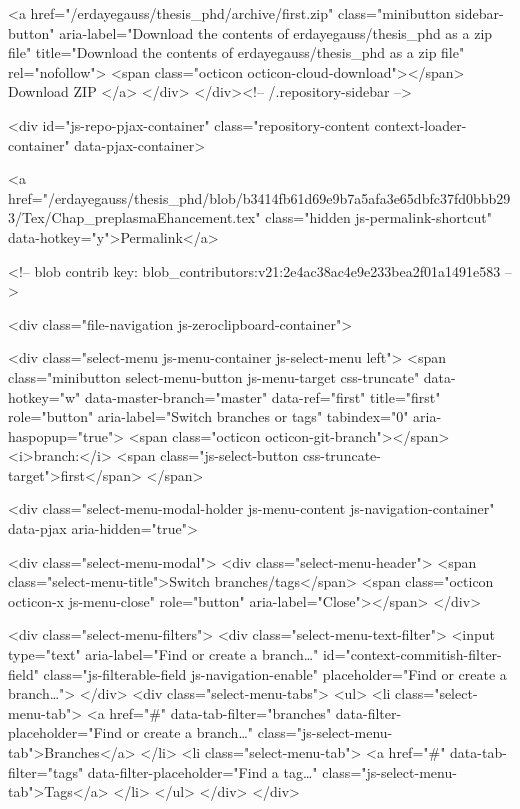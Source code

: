                 <a href="/erdayegauss/thesis_phd/archive/first.zip"
                   class="minibutton sidebar-button"
                   aria-label="Download the contents of erdayegauss/thesis_phd as a zip file"
                   title="Download the contents of erdayegauss/thesis_phd as a zip file"
                   rel="nofollow">
                  <span class="octicon octicon-cloud-download"></span>
                  Download ZIP
                </a>
              </div>
        </div><!-- /.repository-sidebar -->

        <div id="js-repo-pjax-container" class="repository-content context-loader-container" data-pjax-container>
          

<a href="/erdayegauss/thesis_phd/blob/b3414fb61d69e9b7a5afa3e65dbfc37fd0bbb293/Tex/Chap_preplasmaEhancement.tex" class="hidden js-permalink-shortcut" data-hotkey="y">Permalink</a>

<!-- blob contrib key: blob_contributors:v21:2e4ac38ac4e9e233bea2f01a1491e583 -->

<div class="file-navigation js-zeroclipboard-container">
  
<div class="select-menu js-menu-container js-select-menu left">
  <span class="minibutton select-menu-button js-menu-target css-truncate" data-hotkey="w"
    data-master-branch="master"
    data-ref="first"
    title="first"
    role="button" aria-label="Switch branches or tags" tabindex="0" aria-haspopup="true">
    <span class="octicon octicon-git-branch"></span>
    <i>branch:</i>
    <span class="js-select-button css-truncate-target">first</span>
  </span>

  <div class="select-menu-modal-holder js-menu-content js-navigation-container" data-pjax aria-hidden="true">

    <div class="select-menu-modal">
      <div class="select-menu-header">
        <span class="select-menu-title">Switch branches/tags</span>
        <span class="octicon octicon-x js-menu-close" role="button" aria-label="Close"></span>
      </div>

      <div class="select-menu-filters">
        <div class="select-menu-text-filter">
          <input type="text" aria-label="Find or create a branch…" id="context-commitish-filter-field" class="js-filterable-field js-navigation-enable" placeholder="Find or create a branch…">
        </div>
        <div class="select-menu-tabs">
          <ul>
            <li class="select-menu-tab">
              <a href="#" data-tab-filter="branches" data-filter-placeholder="Find or create a branch…" class="js-select-menu-tab">Branches</a>
            </li>
            <li class="select-menu-tab">
              <a href="#" data-tab-filter="tags" data-filter-placeholder="Find a tag…" class="js-select-menu-tab">Tags</a>
            </li>
          </ul>
        </div>
      </div>

